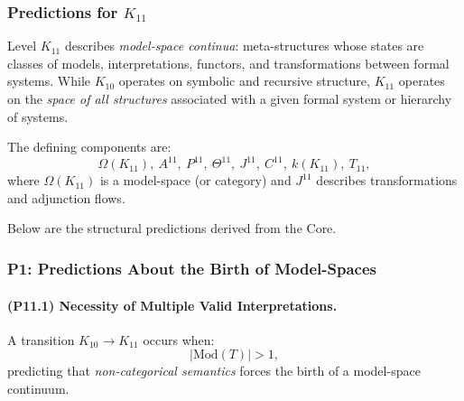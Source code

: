 

\subsubsection{Predictions for $K_{11}$}
\label{sec:predictions-k11}

Level $K_{11}$ describes \emph{model-space continua}:
meta-structures whose states are classes of models,
interpretations, functors, and transformations between
formal systems.
While $K_{10}$ operates on symbolic and recursive structure,
$K_{11}$ operates on the \emph{space of all structures}
associated with a given formal system or hierarchy of systems.

The defining components are:
\[
\Omega(K_{11}),\
A^{11},\
P^{11},\
\Theta^{11},\
J^{11},\
C^{11},\
k(K_{11}),\
T_{11},
\]
where $\Omega(K_{11})$ is a model-space (or category) and
$J^{11}$ describes transformations and adjunction flows.

Below are the structural predictions derived from the Core.

\subsubsection{P1: Predictions About the Birth of Model-Spaces}

\paragraph{(P11.1) Necessity of Multiple Valid Interpretations.}
A transition $K_{10} \to K_{11}$ occurs when:
\[
|\mathrm{Mod}(T)| > 1,
\]
predicting that \emph{non-categorical semantics} forces
the birth of a model-space continuum.

